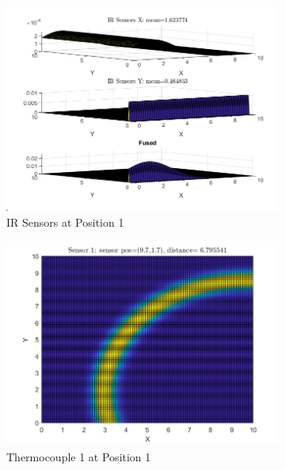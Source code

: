\documentclass[12pt]{article}
\begin{document}
\begin{figure}[H]
    \centering
    \begin{subfigure}[h]{0.8\textwidth}
        \includegraphics[width=\textwidth]{images/P1.png}
        \caption{IR Sensors at Position 1}
        \label{fig:P1IR}
    \end{subfigure}
    \baselineskip
    \begin{subfigure}[h]{0.4\textwidth}
        \includegraphics[width=\textwidth]{images/P1S1.png}
        \caption{Thermocouple 1 at Position 1}
        \label{fig:P1S1}
    \end{subfigure}
    \begin{subfigure}[h]{0.4\textwidth}

\end{subfigure}
\end{figure}
\end{document}
